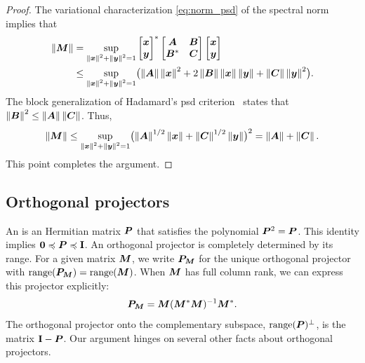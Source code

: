 \documentclass[final]{siamltex}
\begin{document}

\begin{proof}
The variational characterization \eqref{eq:norm_psd} of the spectral norm
implies that
\begin{align*}
\left\Vert { \bm{M} } \right\Vert &=
\sup_{\left\Vert {\bm{x}} \right\Vert^2 + \left\Vert {\bm{y}} \right\Vert^2=1}
\begin{bmatrix} \bm{x} \\ \bm{y} \end{bmatrix}^*
\begin{bmatrix} \bm{A} & \bm{B} \\ \bm{B}^* &
\bm{C} \end{bmatrix}
\begin{bmatrix} \bm{x} \\ \bm{y} \end{bmatrix} \\
&\leq
\sup_{\left\Vert {\bm{x}} \right\Vert^2 + \left\Vert {\bm{y}} \right\Vert^2=1}
\bigl(\left\Vert {\bm{A}} \right\Vert \left\Vert {\bm{x}} \right\Vert^2
        + 2 \left\Vert {\bm{B}} \right\Vert \left\Vert {\bm{x}} \right\Vert \left\Vert {\bm{y}} \right\Vert
        + \left\Vert {\bm{C}} \right\Vert \left\Vert {\bm{y}} \right\Vert^2\bigr).
\end{align*}
The block generalization of Hadamard's psd criterion~\cite[Thm.~7.7.7]{HJ85:Matrix-Analysis}
states that $\left\Vert { \bm{B} } \right\Vert^2 \leq \left\Vert {\bm{A}} \right\Vert \left\Vert {\bm{C}} \right\Vert$.  Thus,
$$
\left\Vert { \bm{M} } \right\Vert \leq \sup_{\left\Vert {\bm{x}} \right\Vert^2 + \left\Vert {\bm{y}} \right\Vert^2=1}
\bigl(\left\Vert {\bm{A}} \right\Vert^{1/2} \left\Vert {\bm{x}} \right\Vert + \left\Vert {\bm{C}} \right\Vert^{1/2} \left\Vert {\bm{y}} \right\Vert\bigr)^{2} =
\left\Vert {\bm{A}} \right\Vert + \left\Vert {\bm{C}} \right\Vert.
$$
This point completes the argument.
\end{proof}

\subsection{Orthogonal projectors} \label{sec:orthproj}

An  is an Hermitian matrix $\bm{P}$
that satisfies the polynomial $\bm{P}^2 = \bm{P}$. This identity implies $\bm{0}
\preccurlyeq \bm{P} \preccurlyeq \mathbf{I}$. An orthogonal projector is completely
determined by its range. For a given matrix $\bm{M}$, we write
$\bm{P}_{\bm{M}}$ for the unique orthogonal projector with
$\operatorname{range}(\bm{P}_{\bm{M}}) = \operatorname{range}(\bm{M})$.  When $\bm{M}$ has
full column rank, we can express this projector explicitly:
\begin{equation} \label{eqn:orth-proj-form}
\mtx{P}_{\mtx{M}} = \mtx{M} (\mtx{M}^\adj \mtx{M})^{-1} \mtx{M}^\adj.
\end{equation}
The orthogonal projector onto the complementary subspace,
$\operatorname{range}(\bm{P})^{\perp}$, is the matrix $\mathbf{I} - \bm{P}$.
Our argument hinges on several other facts about orthogonal
projectors.
\end{document}
